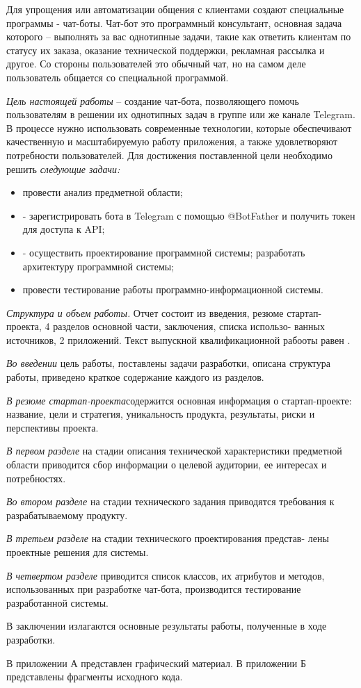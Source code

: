 \newsection
{}

Для упрощения или автоматизации общения с клиентами создают специальные программы - чат-боты. Чат-бот это программный консультант, основная задача которого – выполнять за вас однотипные задачи, такие как ответить клиентам по статусу их заказа, оказание технической поддержки, рекламная рассылка и другое. Со стороны пользователей это обычный чат, но на самом деле пользователь общается со специальной программой.

\emph{Цель настоящей работы} – создание чат-бота, позволяющего помочь пользователям в решении их однотипных задач в группе или же канале Telegram. В процессе нужно использовать современные технологии, которые обеспечивают качественную и масштабируемую работу приложения, а также удовлетворяют потребности пользователей. Для достижения поставленной цели необходимо решить 
 \emph{следующие задачи:}
\begin{itemize}
\item провести анализ предметной области;
\item -	зарегистрировать бота в Telegram с помощью @BotFather и получить токен для доступа к API;
\item -	осуществить проектирование программной системы; разработать архитектуру программной системы;
\item провести тестирование работы программно-информационной системы.
\end{itemize}

\emph{Структура и объем работы.} Отчет состоит из введения, резюме стартап-проекта, 4 разделов основной части, заключения, списка использо- ванных источников, 2 приложений. Текст выпускной квалификационной рабооты равен .

\emph{Во введении} цель работы, поставлены задачи разработки, описана структура работы, приведено краткое содержание каждого из разделов.

\emph{В резюме стартап-проекта}содержится основная информация о стартап-проекте: название, цели и стратегия, уникальность продукта, результаты, риски и перспективы проекта.

\emph{В первом разделе} на стадии описания технической характеристики предметной области приводится сбор информации о целевой аудитории, ее интересах и потребностях.

\emph{Во втором разделе} на стадии технического задания приводятся требования к разрабатываемому продукту.

\emph{В третьем разделе} на стадии технического проектирования представ- лены проектные решения для системы.

\emph{В четвертом разделе} приводится список классов, их атрибутов и методов, использованных при разработке чат-бота, производится тестирование разработанной системы.

В заключении излагаются основные результаты работы, полученные в ходе разработки.

В приложении А представлен графический материал.
В приложении Б представлены фрагменты исходного кода. 
